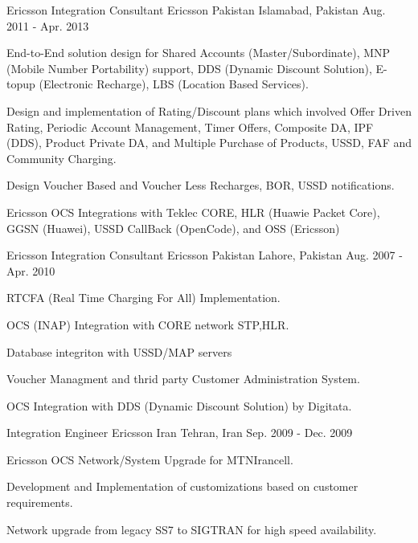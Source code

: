 \begin{cventries}
  \cventry
    {Ericsson Integration Consultant} %
    {Ericsson Pakistan} %
    {Islamabad, Pakistan} %
    {Aug. 2011 - Apr. 2013} %
    {
      \begin{cvitems} %
        \item {End-to-End solution design for Shared Accounts (Master/Subordinate), MNP (Mobile Number Portability) support, DDS (Dynamic Discount Solution), E-topup (Electronic Recharge), LBS (Location Based Services).}
        \item {Design and implementation of Rating/Discount plans which involved Offer Driven Rating, Periodic Account Management, Timer Offers, Composite DA, IPF (DDS), Product Private DA, and Multiple Purchase of Products, USSD, FAF and Community Charging.}
        \item {Design Voucher Based and Voucher Less Recharges, BOR, USSD notifications.}
        \item {Ericsson OCS Integrations with Teklec CORE, HLR (Huawie Packet Core), GGSN (Huawei), USSD CallBack (OpenCode), and OSS (Ericsson)}
      \end{cvitems}
    }

  \cventry
    {Ericsson Integration Consultant} %
    {Ericsson Pakistan} %
    {Lahore, Pakistan} %
    {Aug. 2007 - Apr. 2010} %
    {
      \begin{cvitems} %
        \item {RTCFA (Real Time Charging For All) Implementation.}
        \item {OCS (INAP) Integration with CORE network STP,HLR.}
        \item {Database integriton with USSD/MAP servers}
        \item {Voucher Managment and thrid party Customer Administration System.}
        \item {OCS Integration with DDS (Dynamic Discount Solution) by Digitata.}
      \end{cvitems}
    }

  \cventry
    {Integration Engineer} %
    {Ericsson Iran} %
    {Tehran, Iran} %
    {Sep. 2009 - Dec. 2009} %
    {
      \begin{cvitems} %
        \item {Ericsson OCS Network/System Upgrade for MTNIrancell.}
        \item {Development and Implementation of customizations based on customer requirements.}
        \item {Network upgrade from legacy SS7 to SIGTRAN for high speed availability.}
      \end{cvitems}
    }
\end{cventries}
